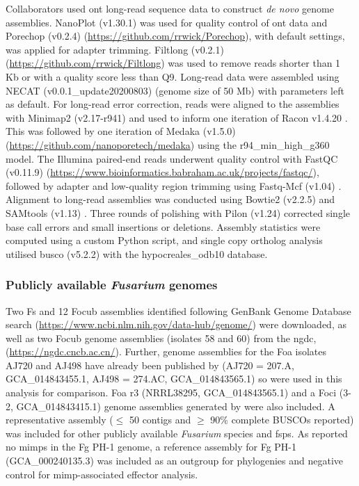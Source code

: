 Collaborators used \Ac{ont} long-read sequence data to construct \textit{de novo} genome assemblies. NanoPlot (v1.30.1) \parencite{DeCoster2018} was used for quality control of \ac{ont} data and Porechop (v0.2.4) (\href{https://github.com/rrwick/Porechop}{https://github.com/rrwic\-k/Porechop}), with default settings, was applied for adapter trimming. Filtlong (v0.2.1)  (\href{https://github.com/rrwick/Filtlong}{https://github.com/rrwick/Filtlong}) was used to remove reads shorter than 1 Kb or with a quality score less than Q9. Long-read data were assembled using NECAT (v0.0.1\_update20200803) \parencite{Chen2021} (genome size of 50 Mb) with parameters left as default. For long-read error correction, reads were aligned to the assemblies with Minimap2 (v2.17-r941) \parencite{Li2018} and used to inform one iteration of Racon v1.4.20 \parencite{Vaser2017}. This was followed by one iteration of Medaka (v1.5.0) (\href{https://github.com/nanoporetech/medaka}{https://github.com/nanoporetech/medaka}) using the r94\_min\_high\_g360 model. The Illumina paired-end reads underwent quality control with FastQC (v0.11.9) (\href{https://www.bioinformatics.babraham.ac.uk/projects/fastqc/}{https://www.bioinformatics.\-babraham.ac.uk/projects/fastqc/}), followed by adapter and low-quality region trimming using Fastq-Mcf (v1.04) \parencite{Aronesty2013}. Alignment to long-read assemblies was conducted using Bowtie2 (v2.2.5) \parencite{Langmead2012} and SAMtools (v1.13) \Parencite{Danecek2021}. Three rounds of polishing with Pilon (v1.24) \parencite{Walker2014} corrected single base call errors and small insertions or deletions. Assembly statistics were computed using a custom Python script, and single copy ortholog analysis utilised \ac{busco} (v5.2.2) \parencite{Simao2015} with the hypocreales\_odb10 database.

\subsubsection{Publicly available \textit{Fusarium} genomes}

Two \ac{Fs} and 12 \ac{Focub} assemblies identified following GenBank Genome Database search (\href{https://www.ncbi.nlm.nih.gov/data-hub/genome}{https://ww\-w.ncbi.nlm.nih.gov/data-hub/genome/}) were downloaded, as well as two \ac{Focub} genome assemblies (isolates 58 and 60) from the \ac{ngdc}, (\href{https://ngdc.cncb.ac.cn}{https:/\-/ngdc.cncb.ac.cn/}). Further, genome assemblies for the \ac{Foa} isolates AJ720 and AJ498 have already been published by \textcite{Henry2020} (AJ720 = 207.A, GCA\_014843455.1,  AJ498 = 274.AC, GCA\_014843565.1) so were used in this analysis for comparison. \Ac{Foa} \ac{r3} (NRRL38295, GCA\_014843565.1) and a \ac{Foci} (3-2, GCA\_014843415.1) genome assemblies generated by \textcite{Henry2020} were also included. A representative assembly (\( \leq \) 50 contigs and \(\geq \) 90\% complete BUSCOs reported) was included for other publicly available \textit{Fusarium} species and \acp{fsp}. As \textcite{Schmidt2013} reported no \acp{mimp} in the \ac{Fg} PH-1 genome, a reference assembly for \ac{Fg} PH-1 (GCA\_000240135.3) was included as an outgroup for phylogenies and negative control for \ac{mimp}-associated effector analysis.

